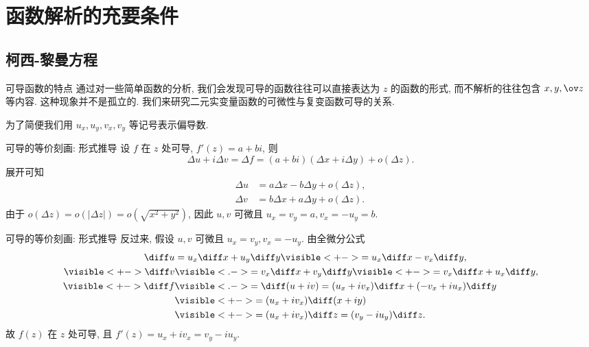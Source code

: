 \section{函数解析的充要条件}

\subsection{柯西-黎曼方程}
\begin{frame}{可导函数的特点}
	\onslide<+->
	通过对一些简单函数的分析, 我们会发现可导的函数往往可以直接表达为 $z$ 的函数的形式, 而不解析的往往包含 $x,y,\ov z$ 等内容.
	\onslide<+->
	这种现象并不是孤立的.
	\onslide<+->
	我们来研究二元实变量函数的可微性与复变函数可导的关系.

	\onslide<+->
	为了简便我们用 $u_x,u_y,v_x,v_y$ 等记号表示偏导数.
\end{frame}


\begin{frame}{可导的等价刻画: 形式推导}
	\onslide<+->
	设 \alert{$f$ 在 $z$ 处可导}, $f'(z)=a+bi$,
	\onslide<+->
	则
	\[\Delta u+i\Delta v=\Delta f=(a+bi)(\Delta x+i\Delta y)+o(\Delta z).\]
	\onslide<+->展开可知
	\begin{align*}
		\Delta u&=a\Delta x-b\Delta y+o(\Delta z),\\
		\Delta v&=b\Delta x+a\Delta y+o(\Delta z).
	\end{align*}
	\onslide<+->
	由于 $o(\Delta z)=o(|\Delta z|)=o(\sqrt{x^2+y^2})$,
	\onslide<+->
	因此 \alert{$u,v$ 可微且 $u_x=v_y=a,v_x=-u_y=b$}.
\end{frame}


\begin{frame}{可导的等价刻画: 形式推导}
	\onslide<+->
	反过来, 假设 \alert{$u,v$ 可微且 $u_x=v_y, v_x=-u_y$}.
	\onslide<+->
	由全微分公式
	\begin{align*}
		\diff u&=u_x\diff x+u_y\diff y
		\visible<+->{=u_x\diff x-v_x\diff y,}\\
		\visible<+->{\diff v}&\visible<.->{=v_x\diff x+v_y\diff y}\visible<+->{=v_x\diff x+u_x\diff y,}\\
		\visible<+->{\diff f}&
		\visible<.->{=\diff (u+iv)=(u_x+i v_x)\diff x+(-v_x+i u_x)\diff y}\\
		&\visible<+->{=(u_x+i v_x)\diff(x+iy)}\\
		&\visible<+->{=(u_x+i v_x)\diff z=(v_y-i u_y)\diff z.}
	\end{align*}
	\onslide<+->
	故 \alert{$f(z)$ 在 $z$ 处可导, 且 $f'(z)=u_x+i v_x=v_y-i u_y$}.
\end{frame}


